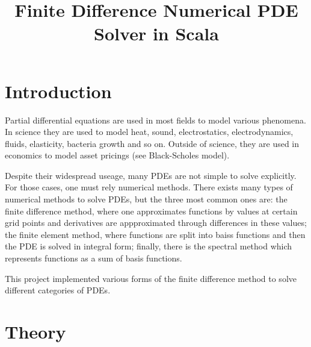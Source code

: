 
\usepackage{amsmath}
\usepackage{graphicx}
\usepackage{epsfig}
\usepackage{amsmath}
\usepackage{hyperref}
\usepackage{amssymb}
\usepackage{amsthm}
\usepackage{booktabs}
\usepackage{stmaryrd}
\usepackage{setspace}
\usepackage{url}
\usepackage{listings}
\newcommand{\verba}[1]{{\ttfamily #1}}
\usepackage{pgf,tikz}
\usetikzlibrary{arrows}
\usepackage{longtable}
\usepackage[figuresright]{rotating}
\usepackage{mathrsfs}
\usepackage[margin=1in]{geometry}

\title{Finite Difference Numerical PDE Solver in Scala}
\date{}


\maketitle
\tableofcontents
\pagebreak

\section{Introduction}
\label{sec:Intro}
\onehalfspacing
Partial differential equations are used in most fields to
model various phenomena. In science they are used to model heat,
sound, electrostatics, electrodynamics, fluids, elasticity, bacteria
growth and so on. Outside of science, they are used in economics to
model asset pricings (see Black-Scholes model).

Despite their widespread useage, many PDEs are not simple to solve
explicitly. For those cases, one must rely numerical methods. There
exists many types of numerical methods to solve PDEs, but the three
most common ones are: the finite difference method, where one
approximates functions by values at certain grid points and
derivatives are appproximated through differences in these values; the
finite element method, where functions are split into baiss functions
and then the PDE is solved in integral form; finally, there is the
spectral method which represents functions as a sum of basis
functions.

This project implemented various forms of the finite difference method
to solve different categories of PDEs.

\section{Theory}
